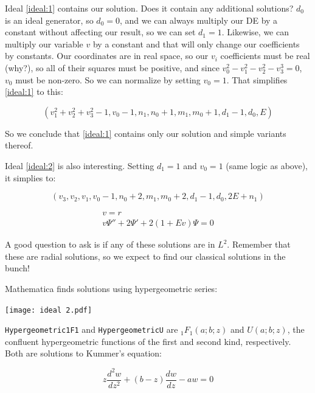 \documentclass{article}
\begin{document}
Ideal \eqref{ideal:1} contains our solution.  Does it contain any additional solutions?  $d_0$ is an ideal generator,
so $d_0=0$, and we can always multiply our DE by a constant without affecting our result, so we can set $d_1=1$.
Likewise, we can multiply our variable $v$ by a constant and that will only change our coefficients by constants.
Our coordinates are in real space, so our $v_i$ coefficients must be real (why?), so all of their squares must
be positive, and since $v_0^2-v_1^2-v_2^2-v_3^3=0$, $v_0$ must be non-zero.  So we can normalize by setting $v_0=1$.
That simplifies \eqref{ideal:1} to this:

\begin{equation}
\left(v_{1}^{2} + v_{2}^{2} + v_{3}^{2} - 1, v_{0} - 1, n_{1}, n_{0} + 1, m_{1}, m_{0} + 1, d_{1} - 1, d_{0}, E\right)
\end{equation}

So we conclude that \eqref{ideal:1} contains only our solution and simple variants thereof.

Ideal \eqref{ideal:2} is also interesting.  Setting $d_1=1$ and $v_0=1$ (same logic as above), it simplies to:

\begin{equation}
\left(v_{3}, v_{2}, v_{1}, v_{0} - 1, n_{0} + 2, m_{1}, m_{0} + 2, d_{1} - 1, d_{0}, 2 E + n_{1}\right)
\end{equation}

\begin{equation}
\begin{gathered}
v=r \\
v \Psi'' + 2 \Psi' + 2(1 + E v) \Psi = 0
\end{gathered}
\end{equation}

A good question to ask is if any of these solutions are in $L^2$.  Remember that these are radial solutions,
so we expect to find our classical solutions in the bunch!

Mathematica finds solutions using hypergeometric series:

\texttt{[image: ideal 2.pdf]}

{\tt Hypergeometric1F1} and {\tt HypergeometricU} are ${}_1F_1(a;b;z)$ and $U(a;b;z)$,
the confluent hypergeometric functions of the first and second kind,
respectively.  Both are solutions to Kummer's equation:

\begin{equation}
z\frac{d^2w}{dz^2} + (b-z)\frac{dw}{dz} - aw = 0
\end{equation}
\end{document}
